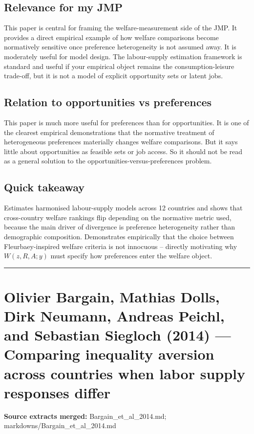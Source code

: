 \documentclass[11pt,a4paper]{article}
\begin{document}
\subsection*{Relevance for my JMP}
This paper is central for framing the welfare-measurement side of the JMP. It provides a direct empirical example of how welfare comparisons become normatively sensitive once preference heterogeneity is not assumed away. It is moderately useful for model design. The labour-supply estimation framework is standard and useful if your empirical object remains the consumption-leisure trade-off, but it is not a model of explicit opportunity sets or latent jobs.

\subsection*{Relation to opportunities vs preferences}
This paper is much more useful for preferences than for opportunities. It is one of the clearest empirical demonstrations that the normative treatment of heterogeneous preferences materially changes welfare comparisons. But it says little about opportunities as feasible sets or job access. So it should not be read as a general solution to the opportunities-versus-preferences problem.

\subsection*{Quick takeaway}
Estimates harmonised labour-supply models across 12 countries and shows that cross-country welfare rankings flip depending on the normative metric used, because the main driver of divergence is preference heterogeneity rather than demographic composition. Demonstrates empirically that the choice between Fleurbaey-inspired welfare criteria is not innocuous -- directly motivating why $W(z,R,A;y)$ must specify how preferences enter the welfare object.


\medskip\hrule\medskip

\section*{Olivier Bargain, Mathias Dolls, Dirk Neumann, Andreas Peichl, and Sebastian Siegloch (2014) — Comparing inequality aversion across countries when labor supply responses differ}

\textbf{Source extracts merged:} Bargain\_et\_al\_2014.md; markdowns/Bargain\_et\_al\_2014.md
\end{document}
